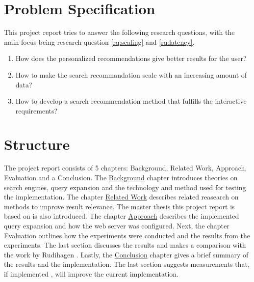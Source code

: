 \section{Problem Specification}
\label{sec:problem-specification}
This project report tries to answer the following research questions, with the main focus being research question \ref{rq:scaling} and \ref{rq:latency}.

\begin{enumerate}
  \item How does the personalized recommendations give better results for the user?
  \item\label{rq:scaling} How to make the search recommandation scale with an increasing amount of data?
  \item\label{rq:latency} How to develop a search recommendation method that fulfills the interactive requirements?
\end{enumerate}

\section{Structure}
The project report consists of 5 chapters: Background, Related Work, Approach, Evaluation and a Conclusion.
The \hyperref[ch:background]{Background} chapter introduces theories on search engines,
query expansion and the technology and method used for testing the implementation.
The chapter \hyperref[ch:related-work]{Related Work} describes related reasearch on methods to improve result relevance.
The master thesis this project report is based on is also introduced.
The chapter \hyperref[ch:approach]{Approach} describes the implemented query expansion and how the web server was configured.
Next, the chapter \hyperref[ch:evaluation]{Evaluation} outlines how the experiments were conducted and the results from the experiments.
The last section discusses the results and makes a comparison with the work by Rudihagen \cite{master-thesis}.
Lastly, the \hyperref[ch:conclusion]{Conclusion} chapter gives a brief summary of the results and the implementation.
The last section suggests measurements that, if implemented , will improve the current implementation.

